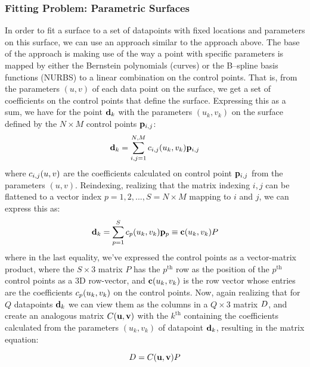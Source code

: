 \subsubsection{Fitting Problem: Parametric Surfaces}
In order to fit a \Bez surface to a set of datapoints with fixed locations and parameters on this surface, we can use an approach similar to the approach above. The base of the approach is making use of the way a point with specific parameters is mapped by either the Bernstein polynomials (\Bez curves) or the B--spline basis functions (NURBS) to a linear combination on the control points. That is, from the parameters $(u,v)$ of each data point on the surface, we get a set of coefficients on the control points that define the surface. Expressing this as a sum, we have for the point $\lsDataPointi{k}$ with the parameters $(u_k,v_k)$ on the surface defined by the $N \times M$ control points $\lsControlPointi{i,j}$:
\begin{equation}
\lsDataPointi{k} = \sum\limits_{i,j=1}^{N,M} \lsControlPointCoefi{i,j}(u_k,v_k) \lsControlPointi{i,j}
\end{equation} 
where $\lsControlPointCoefi{i,j}(u,v)$ are the coefficients calculated on control point $\lsControlPointi{i,j}$ from the parameters $(u,v)$. Reindexing, realizing that the matrix indexing $i,j$ can be flattened to a vector index $p = 1,2,...,S=N\times M$ mapping to $i$ and $j$, we can express this as:
\begin{equation}
\lsDataPointi{k} = \sum\limits_{p=1}^{S} \lsControlPointCoefi{p}(u_k,v_k) \lsControlPointi{p} \equiv \vec{\lsControlPointCoef}(u_k,v_k)\lsControlPointMatrix
\label{eqn:lsmatrix1}
\end{equation} 
where in the last equality, we've expressed the control points as a vector-matrix product, where the $S\times 3$ matrix $P$ has the $p^\text{th}$ row as the position of the $p^\text{th}$ control points as a 3D row-vector, and $\vec{\lsControlPointCoef}(u_k,v_k)$ is the row vector whose entries are the coefficients $\lsControlPointCoefi{p}(u_k,v_k)$ on the control points. Now, again realizing that for $Q$ datapoints $\lsDataPointi{k}$ we can view them as the columns in a $Q\times 3$ matrix $\lsDataPointMatrix$, and create an analogous matrix $\lsControlPointCoefMatrix(\vec{u},\vec{v})$ with the $k^\text{th}$ containing the coefficients calculated from the parameters $(u_k,v_k)$ of datapoint $\lsDataPointi{k}$, resulting in the matrix equation:

\begin{equation}
\lsDataPointMatrix = \lsControlPointCoefMatrix(\vec{u},\vec{v})\lsControlPointMatrix
\label{eqn:lsmatrix2}
\end{equation}

